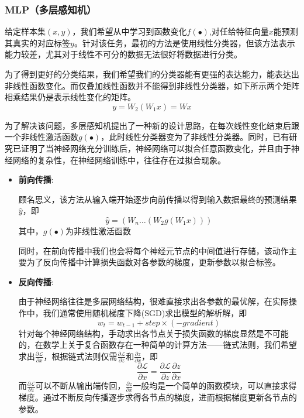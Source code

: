 \documentclass[10pt,a4paper,twoside]{article}
\numberwithin{figure}{section}%
\numberwithin{table}{section}%
\begin{document}
\subsubsection{MLP（多层感知机）}
给定样本集$(x,y)$，我们希望从中学习到函数变化$f(\bullet )$,对任给特征向量$x$能预测其真实的对应标签$y$。针对该任务，最初的方法是使用线性分类器，但该方法表示能力较差，尤其对于线性不可分的数据无法很好将数据进行分类。

为了得到更好的分类结果，我们希望我们的分类器能有更强的表达能力，能表达出非线性函数变化。而仅叠加线性函数并不能得到非线性分类器，如下所示两个矩阵相乘结果仍是表示线性变化的矩阵。
$$
y = W_2(W_1x)=Wx
$$

为了解决该问题，多层感知机提出了一种新的设计思路，在每次线性变化结束后跟一个非线性激活函数$g(\bullet )$，此时线性分类器变为了非线性分类器。同时，已有研究已证明了当神经网络充分训练后，神经网络可以拟合任意函数变化，并且由于神经网络的复杂性，在神经网络训练中，往往存在过拟合现象。

\begin{itemize}
    \item \textbf{前向传播}:

	顾名思义，该方法从输入端开始逐步向前传播以得到输入数据最终的预测结果$\hat{y}$，即
$$
\hat{y} = (W_n\dots(W_2g(W_1x)))
$$
其中，$g(\bullet )$为非线性激活函数

同时，在前向传播中我们也会将每个神经元节点的中间值进行存储，该动作主要为了反向传播中计算损失函数对各参数的梯度，更新参数以拟合标签。
\end{itemize}

\begin{itemize}
    \item \textbf{反向传播}:

	由于神经网络往往是多层网络结构，很难直接求出各参数的最优解，在实际操作中，我们通常使用随机梯度下降(SGD)求出模型的解析解，即
$$
w_t=w_{t-1} + step \times (-gradient)
$$
针对每个神经网络结构，手动求出各节点关于损失函数的梯度显然是不可能的，在数学上关于复合函数存在一种简单的计算方法——链式法则，我们希望求出$\frac{\partial \mathcal{L}}{\partial x} $，根据链式法则仅需$\frac{\partial \mathcal{L}}{\partial z} $和$\frac{\partial z}{\partial x} $，即
$$
\frac{\partial \mathcal{L}}{\partial x}=\frac{\partial \mathcal{L}}{\partial z}\frac{\partial z}{\partial x}
$$
而$\frac{\partial \mathcal{L}}{\partial z}$可以不断从输出端传回，$\frac{\partial z}{\partial x} $一般均是一个简单的函数模块，可以直接求得梯度。通过不断反向传播逐步求得各节点的梯度，进而根据梯度更新各节点的参数。
\end{itemize}
\end{document}
